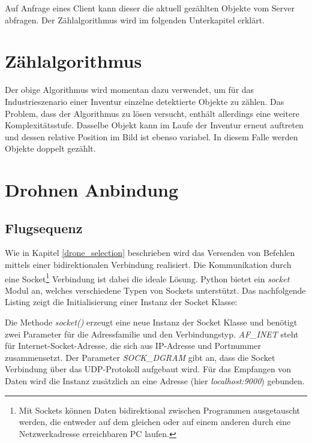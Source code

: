 Auf Anfrage eines Client kann dieser die aktuell gezählten Objekte vom Server abfragen. Der Zählalgorithmus wird im folgenden Unterkapitel erklärt. 

\section{Zählalgorithmus}



Der obige Algorithmus wird momentan dazu verwendet, um für das Industrieszenario einer Inventur einzelne detektierte Objekte zu zählen. Das Problem, dass der Algorithmus zu lösen versucht, enthält allerdings eine weitere Komplexitätsstufe. Dasselbe Objekt kann im Laufe der Inventur erneut auftreten und dessen relative Position im Bild ist ebenso variabel. In diesem Falle werden Objekte doppelt gezählt. 

\section{Drohnen Anbindung}

\subsection*{Flugsequenz}
Wie in Kapitel \ref{drone_selection} beschrieben wird das Versenden von Befehlen mittels einer bidirektionalen Verbindung realisiert. Die Kommunikation durch eine Socket\footnote{Mit Sockets können Daten bidirektional zwischen  Programmen ausgetauscht werden, die entweder auf dem gleichen oder auf einem anderen durch eine Netzwerkadresse erreichbaren PC laufen.} Verbindung ist dabei die ideale Lösung. Python bietet ein \textit{socket} Modul an, welches verschiedene Typen von Sockets unterstützt. Das nachfolgende Listing zeigt die Initialisierung einer Instanz der Socket Klasse:



Die Methode \textit{socket()} erzeugt eine neue Instanz der Socket Klasse und benötigt zwei Parameter für die Adressfamilie und den Verbindungstyp. \textit{AF\_INET} steht für Internet-Socket-Adresse, die sich aus IP-Adresse und Portnummer zusammensetzt. Der Parameter \textit{SOCK\_DGRAM} gibt an, dass die Socket Verbindung über das UDP-Protokoll aufgebaut wird. Für das Empfangen von Daten wird die Instanz zusätzlich an eine Adresse (hier \textit{localhost:9000}) gebunden.

